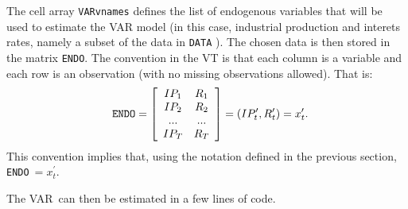 \documentclass[10pt]{article}
\begin{document}
The cell array \texttt{VARvnames} defines the list of endogenous variables
that will be used to estimate the VAR model (in this case, industrial
production and interets rates, namely a subset of the data in \texttt{DATA}%
). The chosen data is then stored in the matrix \texttt{ENDO}. The
convention in the VT is that each column is a variable and each row is an
observation (with no missing observations allowed). That is:%
\begin{equation*}
\text{\texttt{ENDO}}=\left[ 
\begin{array}{cc}
IP_{1} & R_{1} \\ 
IP_{2} & R_{2} \\ 
... & ... \\ 
IP_{T} & R_{T}%
\end{array}%
\right] =\left( IP_{t}^{\prime },R_{t}^{\prime }\right) =x_{t}^{\prime }.
\end{equation*}%
This convention implies that, using the notation defined in the previous
section, \texttt{ENDO}$\ =x_{t}^{\prime }$. 

The VAR\ can then be estimated in a few lines of code.
\end{document}
